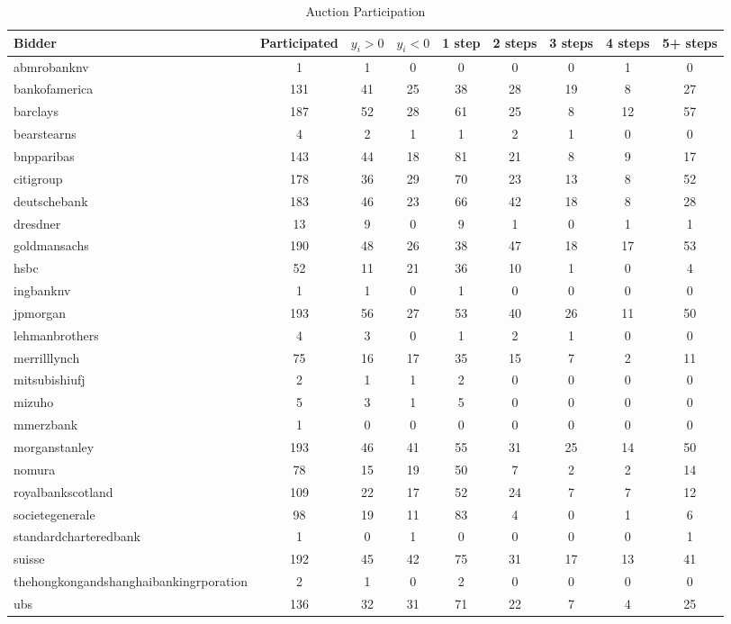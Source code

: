 \begin{table}[htbp]
\centering
\caption{Auction Participation}
\label{tab:os2}
\begin{tabular}{lcccccccc}
\hline\hline
Bidder & Participated & $y_i>0$ & $y_i<0$ & 1 step & 2 steps & 3 steps & 4 steps & 5+ steps \\
\hline
abmrobanknv & 1 & 1 & 0 & 0 & 0 & 0 & 1 & 0 \\
bankofamerica & 131 & 41 & 25 & 38 & 28 & 19 & 8 & 27 \\
barclays & 187 & 52 & 28 & 61 & 25 & 8 & 12 & 57 \\
bearstearns & 4 & 2 & 1 & 1 & 2 & 1 & 0 & 0 \\
bnpparibas & 143 & 44 & 18 & 81 & 21 & 8 & 9 & 17 \\
citigroup & 178 & 36 & 29 & 70 & 23 & 13 & 8 & 52 \\
deutschebank & 183 & 46 & 23 & 66 & 42 & 18 & 8 & 28 \\
dresdner & 13 & 9 & 0 & 9 & 1 & 0 & 1 & 1 \\
goldmansachs & 190 & 48 & 26 & 38 & 47 & 18 & 17 & 53 \\
hsbc & 52 & 11 & 21 & 36 & 10 & 1 & 0 & 4 \\
ingbanknv & 1 & 1 & 0 & 1 & 0 & 0 & 0 & 0 \\
jpmorgan & 193 & 56 & 27 & 53 & 40 & 26 & 11 & 50 \\
lehmanbrothers & 4 & 3 & 0 & 1 & 2 & 1 & 0 & 0 \\
merrilllynch & 75 & 16 & 17 & 35 & 15 & 7 & 2 & 11 \\
mitsubishiufj & 2 & 1 & 1 & 2 & 0 & 0 & 0 & 0 \\
mizuho & 5 & 3 & 1 & 5 & 0 & 0 & 0 & 0 \\
mmerzbank & 1 & 0 & 0 & 0 & 0 & 0 & 0 & 0 \\
morganstanley & 193 & 46 & 41 & 55 & 31 & 25 & 14 & 50 \\
nomura & 78 & 15 & 19 & 50 & 7 & 2 & 2 & 14 \\
royalbankscotland & 109 & 22 & 17 & 52 & 24 & 7 & 7 & 12 \\
societegenerale & 98 & 19 & 11 & 83 & 4 & 0 & 1 & 6 \\
standardcharteredbank & 1 & 0 & 1 & 0 & 0 & 0 & 0 & 1 \\
suisse & 192 & 45 & 42 & 75 & 31 & 17 & 13 & 41 \\
thehongkongandshanghaibankingrporation & 2 & 1 & 0 & 2 & 0 & 0 & 0 & 0 \\
ubs & 136 & 32 & 31 & 71 & 22 & 7 & 4 & 25 \\
\hline\hline
\end{tabular}
\end{table}
